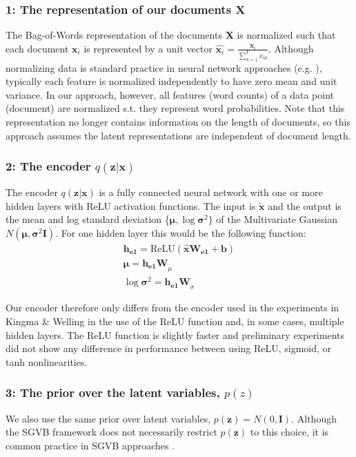 \documentclass{report}
\begin{document}
\subsubsection{1: The representation of our documents $\mathbf{X}$} The Bag-of-Words representation of the documents ${\mathbf{X}}$ is normalized such that each document $\mathbf{x}_i$ is represented by a unit vector $\hat{\mathbf{x}_i} = \frac{\mathbf{x}_i}{\sum_{k=1}^{V}x_{ik}}$. Although normalizing data is standard practice in neural network approaches (e.g. \cite{bishop1995neural}), typically each feature is normalized independently to have zero mean and unit variance. In our approach, however, all features (word counts) of a data point (document) are normalized s.t. they represent word probabilities.  Note that this representation no longer contains information on the length of documents, so this approach assumes the latent representations are independent of document length.
\\
\subsubsection{2: The encoder $q(\mathbf{z}|\mathbf{x})$}
The encoder $q(\mathbf{z}|\mathbf{x})$ is a fully connected neural network with one or more hidden layers with ReLU activation functions. The input is $\tilde{\mathbf{x}}$ and the output is the mean and log standard deviation \{$\boldsymbol{\mu}, \log \boldsymbol{\sigma} ^2\}$ of the Multivariate Gaussian $N(\boldsymbol{\mu}, \boldsymbol{\sigma} ^2\textbf{I})$. For one hidden layer this would be the following function:
\begin{align}
\mathbf{h_{e1}} = \text{ReLU}(\mathbf{\hat{x}}\mathbf{W_{e1}} + \mathbf{b}) \label{he1}\\
\boldsymbol{\mu} = \mathbf{h_{e1}W}_{\mu} \label{vae_encoding_mu} \\
\log \boldsymbol{\sigma}^2 = \mathbf{h_{e1}W}_{\sigma} \label{vae_encoding_sig}
\end{align} 


Our encoder therefore only differs from the encoder used in the experiments in Kingma \& Welling \cite{kingma2013auto} in the use of the ReLU function and, in some cases, multiple hidden layers. The ReLU function is slightly faster and preliminary experiments did not show any difference in performance between using ReLU, sigmoid, or tanh nonlinearities. 

\subsubsection{3: The prior  over the latent variables, $p(z)$}
We also use the same prior over latent variables, $p(\mathbf{z}) = N(0,\textbf{I})$. Although the SGVB framework does not necessarily restrict $p(\mathbf{z})$ to this choice, it is common practice in SGVB approaches \cite{kingma2013auto} \cite{rezende2014stochastic} \cite{doersch2016tutorial}. 
\end{document}
